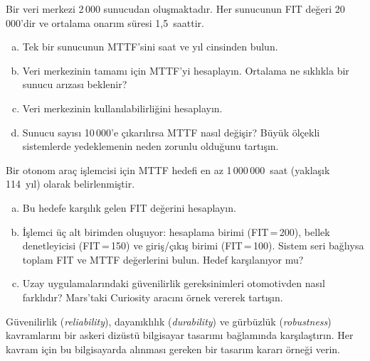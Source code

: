 \begin{alistirma}[\zor]
Bir veri merkezi 2\,000 sunucudan oluşmaktadır. Her sunucunun FIT değeri 20\,000'dir ve ortalama onarım süresi 1{,}5~saattir.
\begin{enumerate}[(a)]
    \item Tek bir sunucunun MTTF'sini saat ve yıl cinsinden bulun.
    \item Veri merkezinin tamamı için MTTF'yi hesaplayın. Ortalama ne sıklıkla bir sunucu arızası beklenir?
    \item Veri merkezinin kullanılabilirliğini hesaplayın.
    \item Sunucu sayısı 10\,000'e çıkarılırsa MTTF nasıl değişir? Büyük ölçekli sistemlerde yedeklemenin neden zorunlu olduğunu tartışın.
\end{enumerate}
\end{alistirma}

\begin{alistirma}[\zor]
Bir otonom araç işlemcisi için MTTF hedefi en az 1\,000\,000~saat (yaklaşık 114~yıl) olarak belirlenmiştir.
\begin{enumerate}[(a)]
    \item Bu hedefe karşılık gelen FIT değerini hesaplayın.
    \item İşlemci üç alt birimden oluşuyor: hesaplama birimi (FIT\,=\,200), bellek denetleyicisi (FIT\,=\,150) ve giriş/çıkış birimi (FIT\,=\,100). Sistem seri bağlıysa toplam FIT ve MTTF değerlerini bulun. Hedef karşılanıyor mu?
    \item Uzay uygulamalarındaki güvenilirlik gereksinimleri otomotivden nasıl farklıdır? Mars'taki Curiosity aracını örnek vererek tartışın.
\end{enumerate}
\end{alistirma}

\begin{alistirma}[\orta]
Güvenilirlik (\emph{reliability}), dayanıklılık (\emph{durability}) ve gürbüzlük (\emph{robustness}) kavramlarını bir askeri dizüstü bilgisayar tasarımı bağlamında karşılaştırın. Her kavram için bu bilgisayarda alınması gereken bir tasarım kararı örneği verin.
\end{alistirma}
